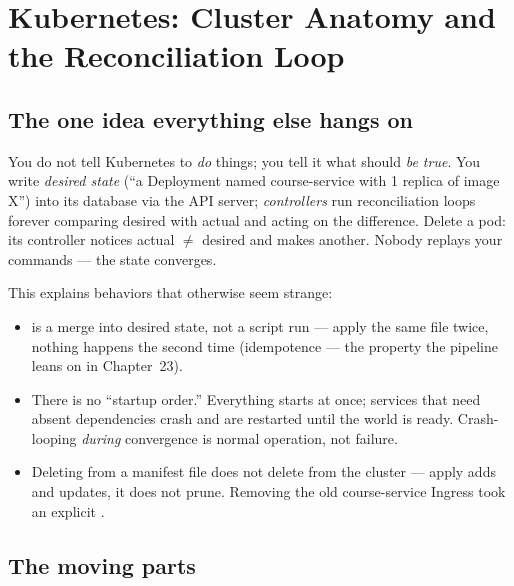 \chapter{Kubernetes: Cluster Anatomy and the Reconciliation Loop}
\label{ch:cluster}

\section{The one idea everything else hangs on}

You do not tell Kubernetes to \emph{do} things; you tell it what should
\emph{be true}. You write \emph{desired state} (``a Deployment named
course-service with 1 replica of image X'') into its database via the
API server; \emph{controllers} run reconciliation loops forever
comparing desired with actual and acting on the difference. Delete a
pod: its controller notices actual $\neq$ desired and makes another.
Nobody replays your commands --- the state converges.

This explains behaviors that otherwise seem strange:

\begin{itemize}
  \item {} is a merge into desired state, not a
  script run --- apply the same file twice, nothing happens the second
  time (idempotence --- the property the pipeline leans on in
  Chapter~23).
  \item There is no ``startup order.'' Everything starts at once;
  services that need absent dependencies crash and are restarted until
  the world is ready. Crash-looping \emph{during} convergence is normal
  operation, not failure.
  \item Deleting from a manifest file does not delete from the cluster
  --- apply adds and updates, it does not prune. Removing the old
  course-service Ingress took an explicit .
\end{itemize}

\section{The moving parts}

